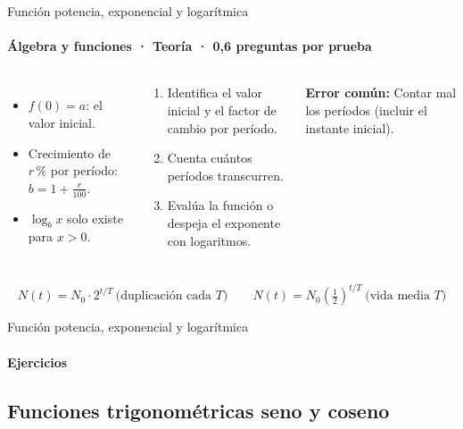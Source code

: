 \documentclass[aspectratio=169,11pt]{beamer}
\newlength{\ajustealto}
\newenvironment{ajustar}[1][0.74\textheight]
  {\setlength{\ajustealto}{#1}\begin{lrbox}{\ajustecaja}\begin{minipage}{\textwidth}}
  {\end{minipage}\end{lrbox}%
   \ifdim\dimexpr\ht\ajustecaja+\dp\ajustecaja\relax>\ajustealto
     \resizebox*{!}{\ajustealto}{\usebox{\ajustecaja}}\else\usebox{\ajustecaja}\fi}
\begin{document}
\begin{frame}{Función potencia, exponencial y logarítmica}
\label{tema-m2-exponencial}
\framesubtitle{Álgebra y funciones · Teoría · 0,6 preguntas por prueba}
\begin{ajustar}
\begin{columns}[T,onlytextwidth]
\begin{itemize}\footnotesize
\item $f(0)=a$: el valor inicial.
\item Crecimiento de $r\,\%$ por período: $b=1+\frac{r}{100}$.
\item $\log_b x$ solo existe para $x>0$.
\end{itemize}
\begin{cajaregla}\scriptsize \begin{enumerate}\item Identifica el valor inicial y el factor de cambio por período.\item Cuenta cuántos períodos transcurren.\item Evalúa la función o despeja el exponente con logaritmos.\end{enumerate}\end{cajaregla}
\begin{notagris}\scriptsize \textbf{Error común:} Contar mal los períodos (incluir el instante inicial).\end{notagris}
\end{columns}
\begin{cajaclave}[Modelos]\footnotesize
\[N(t)=N_0\cdot 2^{t/T}\ \text{(duplicación cada } T\text{)} \quad\quad N(t)=N_0\left(\tfrac{1}{2}\right)^{t/T}\ \text{(vida media } T\text{)}\]
\end{cajaclave}
\end{ajustar}
\end{frame}

\begin{frame}{Función potencia, exponencial y logarítmica}
\framesubtitle{Ejercicios}
\vfill{}
\vfill
\end{frame}

\subsection{Funciones trigonométricas seno y coseno}
\end{document}
